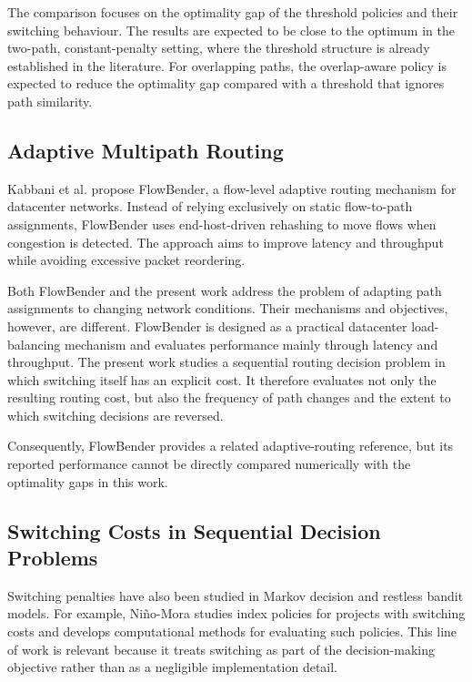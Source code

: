 \documentclass{amsart}
\begin{document}
The comparison focuses on the optimality gap of the threshold policies and their switching behaviour. The results are expected to be close to the optimum in the two-path, constant-penalty setting, where the threshold structure is already established in the literature. For overlapping paths, the overlap-aware policy is expected to reduce the optimality gap compared with a threshold that ignores path similarity.

\subsection{Adaptive Multipath Routing}

Kabbani et al. \cite{kabbani2014} propose FlowBender, a flow-level adaptive routing mechanism for datacenter networks. Instead of relying exclusively on static flow-to-path assignments, FlowBender uses end-host-driven rehashing to move flows when congestion is detected. The approach aims to improve latency and throughput while avoiding excessive packet reordering.

Both FlowBender and the present work address the problem of adapting path assignments to changing network conditions. Their mechanisms and objectives, however, are different. FlowBender is designed as a practical datacenter load-balancing mechanism and evaluates performance mainly through latency and throughput. The present work studies a sequential routing decision problem in which switching itself has an explicit cost. It therefore evaluates not only the resulting routing cost, but also the frequency of path changes and the extent to which switching decisions are reversed.

Consequently, FlowBender provides a related adaptive-routing reference, but its reported performance cannot be directly compared numerically with the optimality gaps in this work.

\subsection{Switching Costs in Sequential Decision Problems}

Switching penalties have also been studied in Markov decision and restless bandit models. For example, Niño-Mora \cite{ninomora2008} studies index policies for projects with switching costs and develops computational methods for evaluating such policies. This line of work is relevant because it treats switching as part of the decision-making objective rather than as a negligible implementation detail.
\end{document}
